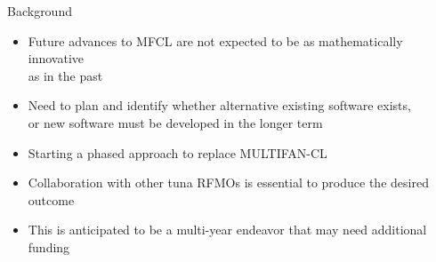 \documentclass[aspectratio=169]{beamer}
\begin{document}

\begin{frame}{Background}\small
  \begin{itemize}
    \item[] Future advances to MFCL are not expected to be as mathematically
    innovative\\
    as in the past\\[4ex]

    \item[] Need to plan and identify whether alternative existing software
    exists,\\
    or new software must be developed in the longer term\\[4ex]

    \item[] Starting a phased approach to replace MULTIFAN-CL\\[4ex]

    \item[] Collaboration with other tuna RFMOs is essential to produce the
    desired outcome\\[4ex]

    \item[] This is anticipated to be a multi-year endeavor that may need
    additional funding\\[3ex]
  \end{itemize}
\end{frame}

\end{document}
